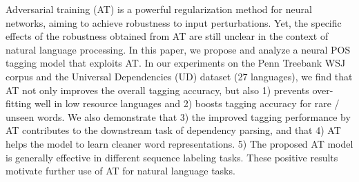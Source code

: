 Adversarial training (AT) is a powerful regularization method for neural networks, aiming to achieve robustness to input perturbations. Yet, the specific effects of the robustness obtained from AT are still unclear in the context of natural language processing. In this paper, we propose and analyze a neural POS tagging model that exploits AT. In our experiments on the Penn Treebank WSJ corpus and the Universal Dependencies (UD) dataset (27 languages), we find that AT not only improves the overall tagging accuracy, but also 1) prevents over-fitting well in low resource languages and 2) boosts tagging accuracy for rare / unseen words. We also demonstrate that 3) the improved tagging performance by AT contributes to the downstream task of dependency parsing, and that 4) AT helps the model to learn cleaner word representations. 5) The proposed AT model is generally effective in different sequence labeling tasks. These positive results motivate further use of AT for natural language tasks.
